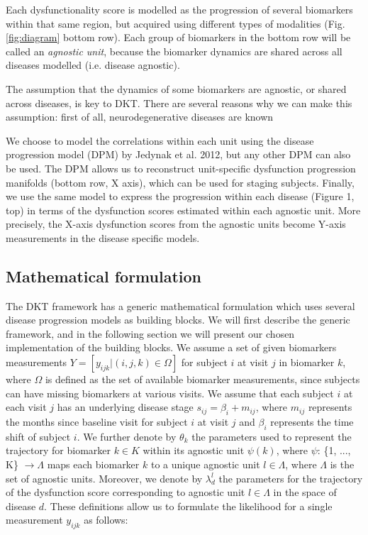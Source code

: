 \documentclass{llncs}
\begin{document}
Each dysfunctionality score is modelled as the progression of several biomarkers within that same region, but acquired using different types of modalities (Fig. \ref{fig:diagram} bottom row). Each group of biomarkers in the bottom row will be called an \emph{agnostic unit}, because the biomarker dynamics are shared across all diseases modelled (i.e. disease agnostic).

The assumption that the dynamics of some biomarkers are agnostic, or shared across diseases, is key to DKT. There are several reasons why we can make this assumption: first of all, neurodegenerative diseases are known

We choose to model the correlations within each unit using the disease progression model (DPM) by Jedynak et al. 2012, but any other DPM can also be used. The DPM allows us to reconstruct unit-specific dysfunction progression manifolds (bottom row, X axis), which can be used for staging subjects. Finally, we use the same model to express the progression within each disease (Figure 1, top) in terms of the dysfunction scores estimated within each agnostic unit. More precisely, the X-axis dysfunction scores from the agnostic units become Y-axis measurements in the disease specific models.

\subsection{Mathematical formulation}

The DKT framework has a generic mathematical formulation which uses several disease progression models as building blocks. We will first describe the generic framework, and in the following section we will present our chosen implementation of the building blocks. We assume a set of given biomarkers measurements $Y = [y_{ijk} | (i,j,k) \in \Omega]$ for subject $i$ at visit $j$ in biomarker $k$, where $\Omega$ is defined as the set of available biomarker measurements, since subjects can have missing biomarkers at various visits. We assume that each subject $i$ at each visit $j$ has an underlying disease stage $s_{ij} = \beta_i + m_{ij}$, where $m_{ij}$ represents the months since baseline visit for subject $i$ at visit $j$ and $\beta_i$ represents the time shift of subject $i$. We further denote by $\theta_k$ the parameters used to represent the trajectory for biomarker $k \in K$ within its agnostic unit $\psi(k)$, where $\psi$: \{1, ..., K\} $ \rightarrow \Lambda$ maps each biomarker $k$ to a unique agnostic unit $l \in \Lambda$, where $\Lambda$ is the set of agnostic units. Moreover, we denote by $\lambda_d^l$ the parameters for the trajectory of the dysfunction score corresponding to agnostic unit $l \in \Lambda$ in the space of disease $d$. These definitions allow us to formulate the likelihood for a single measurement $y_{ijk}$ as follows:
\end{document}

